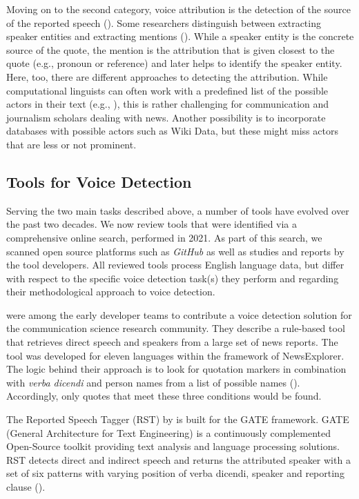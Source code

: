 \documentclass{ccr}
\begin{document}
Moving on to the second category, voice attribution is the detection of the source of the reported speech (\cite{muzny2017two}). Some researchers distinguish between extracting speaker entities and extracting mentions (\cite{muzny2017two}). While a speaker entity is the concrete source of the quote, the mention is the attribution that is given closest to the quote (e.g., pronoun or reference) and later helps to identify the speaker entity. Here, too, there are different approaches to detecting the attribution. While computational linguists can often work with a predefined list of the possible actors in their text (e.g., \cite{he-etal-2013-identification}), this is rather challenging for communication and journalism scholars dealing with news. Another possibility is to incorporate databases with possible actors such as Wiki Data, but these might miss actors that are less or not prominent.

\subsection{Tools for Voice Detection}Serving the two main tasks described above, a number of tools have
evolved over the past two decades. We now review tools that were identified via a comprehensive online search, performed in 2021. As part of this search, we scanned open source platforms such as \textit{GitHub} as well as studies and reports by the tool developers. All reviewed tools process English language data, but differ with respect to the specific voice detection task(s) they perform and regarding their methodological approach to voice detection.

\textcite{pouliquen2007automatic} were among the early developer teams to contribute a voice detection solution for the communication science research community. They describe a rule-based tool that retrieves direct speech and speakers from a large set of news reports. The tool was developed for eleven languages within the framework of NewsExplorer. The logic behind their approach is to look for quotation markers in combination with \textit{verba dicendi} and person names from a list of possible names (\cite{pouliquen2007automatic}). Accordingly, only quotes that meet these three conditions would be found.

The Reported Speech Tagger (RST) by \textcite{krestel2008minding} is built for the GATE framework. GATE (General Architecture for Text Engineering) is a continuously complemented Open-Source toolkit providing text analysis and language processing solutions. RST detects direct and indirect speech and returns the attributed speaker with a set of six patterns with varying position of verba dicendi, speaker and reporting clause (\cite{krestel2008minding}).
\end{document}
